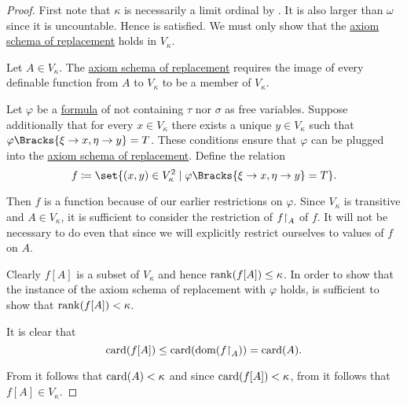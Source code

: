 \begin{proof}
  First note that \( \kappa \) is necessarily a limit ordinal by . It is also larger than \( \omega \) since it is uncountable. Hence  is satisfied. We must only show that the \hyperref[def:zfc/replacement]{axiom schema of replacement} holds in \( V_\kappa \).

  Let \( A \in V_\kappa \). The \hyperref[def:zfc/replacement]{axiom schema of replacement} requires the image of every definable function from \( A \) to \( V_\kappa \) to be a member of \( V_\kappa \).

  Let \( \varphi \) be a \hyperref[def:first_order_syntax/formula]{formula} of \hyperref[def:zfc]{} not containing \( \tau \) nor \( \sigma \) as free variables. Suppose additionally that for every \( x \in V_\kappa \) there exists a unique \( y \in V_\kappa \) such that \( \varphi\Bracks{\xi \to x, \eta \to y} = T \). These conditions ensure that \( \varphi \) can be plugged into the \hyperref[def:zfc/replacement]{axiom schema of replacement}. Define the relation
  \begin{equation*}
    f \coloneqq \set{ (x, y) \in V_\kappa^2 \given \varphi\Bracks{\xi \to x, \eta \to y} = T }.
  \end{equation*}

  Then \( f \) is a function because of our earlier restrictions on \( \varphi \). Since \( V_\kappa \) is transitive and \( A \in V_\kappa \), it is sufficient to consider the restriction of \( f{\upharpoonright}_A \) of \( f \). It will not be necessary to do even that since we will explicitly restrict ourselves to values of \( f \) on \( A \).

  Clearly \( f[A] \) is a subset of \( V_\kappa \) and hence \( \operatorname{rank}(f[A]) \leq \kappa \). In order to show that the instance of the axiom schema of replacement with \( \varphi \) holds, is sufficient to show that \( \operatorname{rank}(f[A]) < \kappa \).

  It is clear that
  \begin{equation*}
    \operatorname{card}(f[A]) \leq \operatorname{card}(\operatorname{dom}(f{\upharpoonright}_A)) = \operatorname{card}(A).
  \end{equation*}

  From  it follows that \( \operatorname{card}(A) < \kappa \) and since \( \operatorname{card}(f[A]) < \kappa \), from  it follows that \( f[A] \in V_\kappa \).
\end{proof}

